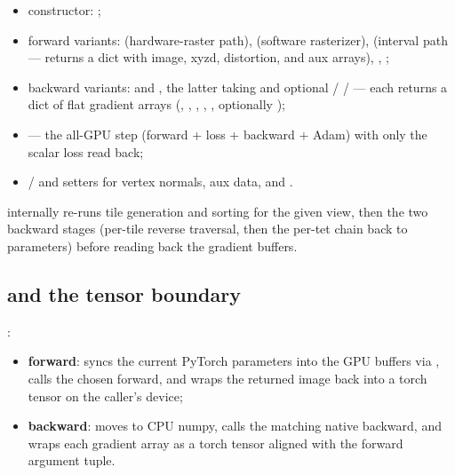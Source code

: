 \begin{itemize}
\item constructor: 
  ;
\item forward variants:  (hardware-raster path),
   (software rasterizer),
   (interval path --- returns a dict with
  image, xyzd, distortion, and aux arrays), ,
  ;
\item backward variants:  and
  , the latter taking  and
  optional  /  / 
  --- each returns a dict of flat
   gradient arrays (, ,
  , , ,
  optionally );
\item {} --- the all-GPU step (forward + loss +
  backward + Adam) with only the scalar loss read back;
\item {} /  and setters for vertex
  normals, aux data, and .
\end{itemize}

 internally re-runs tile generation and
sorting for the given view, then the two backward stages (per-tile
reverse traversal, then the per-tet chain back to parameters) before reading
back the gradient buffers.

\subsection{ and the tensor boundary}

:
\begin{itemize}
\item \textbf{forward}: syncs the current PyTorch parameters into the GPU
  buffers via , calls the chosen forward, and wraps the
  returned image back into a torch tensor on the caller's device;
\item \textbf{backward}: moves  to CPU numpy, calls the
  matching native backward, and wraps each gradient array as a torch tensor
  aligned with the forward argument tuple.
\end{itemize}

